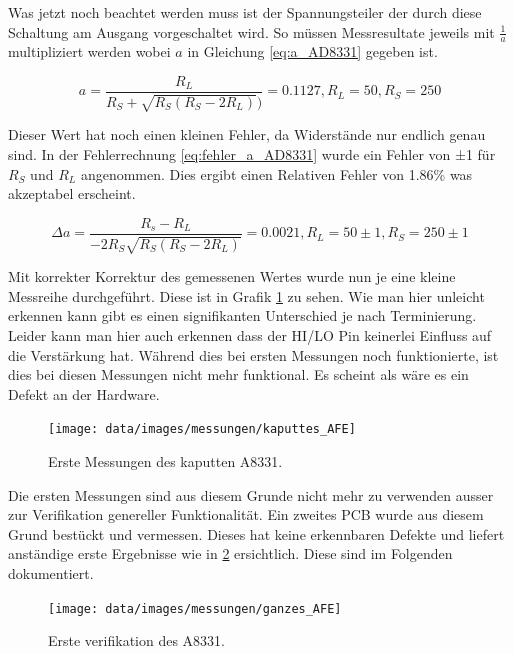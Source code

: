 Was jetzt noch beachtet werden muss ist der Spannungsteiler der durch diese Schaltung am Ausgang vorgeschaltet wird.
So müssen Messresultate jeweils mit $\frac{1}{a}$ multipliziert werden wobei $a$ in Gleichung \ref{eq:a_AD8331} gegeben ist.

\begin{equation}
    a = \frac{R_L}{R_S + \sqrt{R_S(R_S - 2R_L)})} = 0.1127, R_L =50, R_S = 250
    \label{eq:a_AD8331}
\end{equation}

Dieser Wert hat noch einen kleinen Fehler, da Widerstände nur endlich genau sind. In der Fehlerrechnung \ref{eq:fehler_a_AD8331} wurde ein Fehler von ±1 für $R_S$ und $R_L$ angenommen. Dies ergibt einen Relativen Fehler von 1.86\% was akzeptabel erscheint.

\begin{equation}
    \Delta a = \frac{R_s - R_L}{-2R_S\sqrt{R_S(R_S - 2R_L)}} = 0.0021, R_L = 50±1, R_S = 250±1
    \label{eq:fehler_a_AD8331}
\end{equation}

Mit korrekter Korrektur des gemessenen Wertes wurde nun je eine kleine Messreihe durchgeführt. Diese ist in Grafik \ref{fig:kaputtes_AFE} zu sehen. Wie man hier unleicht erkennen kann gibt es einen signifikanten Unterschied je nach Terminierung.
Leider kann man hier auch erkennen dass der HI/LO Pin keinerlei Einfluss auf die Verstärkung hat. Während dies bei ersten Messungen noch funktionierte, ist dies bei diesen Messungen nicht mehr funktional. Es scheint als wäre es ein Defekt an der Hardware.

\begin{figure}[H]
\begin{center}
    \texttt{[image: data/images/messungen/kaputtes\_AFE]}
    \caption{Erste Messungen des kaputten A8331.}
    \label{fig:kaputtes_AFE}
\end{center}
\end{figure}

Die ersten Messungen sind aus diesem Grunde nicht mehr zu verwenden ausser zur Verifikation genereller Funktionalität. Ein zweites PCB wurde aus diesem Grund bestückt und vermessen. Dieses hat keine erkennbaren Defekte und liefert anständige erste Ergebnisse wie in \ref{fig:ganzes_AFE} ersichtlich. Diese sind im Folgenden dokumentiert.

\begin{figure}[H]
\begin{center}
    \texttt{[image: data/images/messungen/ganzes\_AFE]}
    \caption{Erste verifikation des A8331.}
    \label{fig:ganzes_AFE}
\end{center}
\end{figure}

